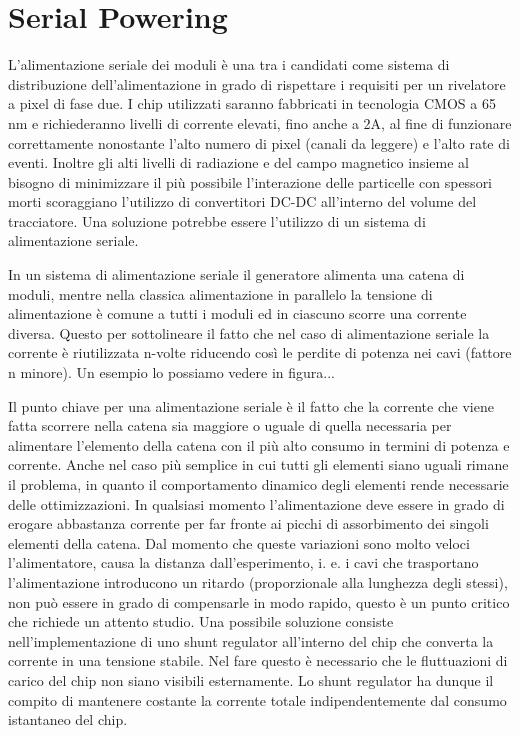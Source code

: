 \chapter{Serial Powering}
L'alimentazione seriale dei moduli è una tra i candidati come sistema di distribuzione dell'alimentazione in grado di rispettare i requisiti per un rivelatore a pixel di fase due.
I chip utilizzati saranno fabbricati in tecnologia CMOS a 65 nm e richiederanno livelli di corrente elevati, fino anche a 2A, al fine di funzionare correttamente nonostante l'alto numero di pixel (canali da leggere) e l'alto rate di eventi.
Inoltre gli alti livelli di radiazione e del campo magnetico insieme al bisogno di minimizzare il più possibile  l'interazione delle particelle con spessori morti scoraggiano l'utilizzo di convertitori DC-DC all'interno del volume del tracciatore. Una soluzione potrebbe essere l'utilizzo di un sistema di alimentazione seriale. 

In un sistema di alimentazione seriale il generatore alimenta una catena di moduli, mentre nella classica alimentazione in parallelo la tensione di alimentazione è comune a tutti i moduli ed in ciascuno scorre una corrente diversa.
Questo per sottolineare il fatto che nel caso di alimentazione seriale la corrente è riutilizzata n-volte riducendo così le perdite di potenza nei cavi (fattore n minore). Un esempio lo possiamo vedere in figura...

Il punto chiave per una alimentazione seriale è il fatto che la corrente che viene fatta scorrere nella catena sia maggiore o uguale di quella necessaria per alimentare l'elemento della catena con il più alto consumo in termini di potenza e corrente.
Anche nel caso più semplice in cui tutti gli elementi siano uguali rimane il problema, in quanto il comportamento dinamico degli elementi rende necessarie delle ottimizzazioni. In qualsiasi momento l'alimentazione deve essere in grado di erogare abbastanza corrente per far fronte ai picchi di assorbimento dei singoli elementi della catena. Dal momento che queste variazioni sono molto veloci l'alimentatore, causa la distanza dall'esperimento, i. e. i cavi che trasportano l'alimentazione introducono un ritardo (proporzionale alla lunghezza degli stessi),
non può essere in grado di compensarle in modo rapido, questo è un punto critico che richiede un attento studio. Una possibile soluzione consiste nell'implementazione di uno shunt regulator all'interno del chip che converta la corrente in una tensione stabile. Nel fare questo è necessario che le fluttuazioni di carico del chip non siano visibili esternamente. Lo shunt regulator ha dunque il compito di mantenere costante la corrente totale indipendentemente dal consumo istantaneo del chip.

